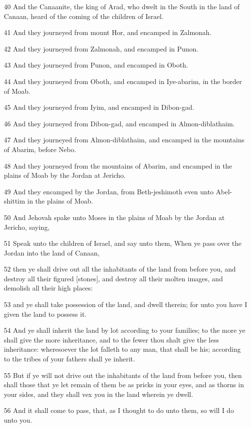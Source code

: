 \par 40 And the Canaanite, the king of Arad, who dwelt in the South in the land of Canaan, heard of the coming of the children of Israel.
\par 41 And they journeyed from mount Hor, and encamped in Zalmonah.
\par 42 And they journeyed from Zalmonah, and encamped in Punon.
\par 43 And they journeyed from Punon, and encamped in Oboth.
\par 44 And they journeyed from Oboth, and encamped in Iye-abarim, in the border of Moab.
\par 45 And they journeyed from Iyim, and encamped in Dibon-gad.
\par 46 And they journeyed from Dibon-gad, and encamped in Almon-diblathaim.
\par 47 And they journeyed from Almon-diblathaim, and encamped in the mountains of Abarim, before Nebo.
\par 48 And they journeyed from the mountains of Abarim, and encamped in the plains of Moab by the Jordan at Jericho.
\par 49 And they encamped by the Jordan, from Beth-jeshimoth even unto Abel-shittim in the plains of Moab.
\par 50 And Jehovah spake unto Moses in the plains of Moab by the Jordan at Jericho, saying,
\par 51 Speak unto the children of Israel, and say unto them, When ye pass over the Jordan into the land of Canaan,
\par 52 then ye shall drive out all the inhabitants of the land from before you, and destroy all their figured [stones], and destroy all their molten images, and demolish all their high places:
\par 53 and ye shall take possession of the land, and dwell therein; for unto you have I given the land to possess it.
\par 54 And ye shall inherit the land by lot according to your families; to the more ye shall give the more inheritance, and to the fewer thou shalt give the less inheritance: wheresoever the lot falleth to any man, that shall be his; according to the tribes of your fathers shall ye inherit.
\par 55 But if ye will not drive out the inhabitants of the land from before you, then shall those that ye let remain of them be as pricks in your eyes, and as thorns in your sides, and they shall vex you in the land wherein ye dwell.
\par 56 And it shall come to pass, that, as I thought to do unto them, so will I do unto you.

